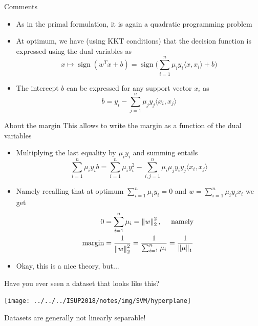 \documentclass[xcolor={usenames,dvipsnames}]{beamer}
\begin{document}
\begin{frame}{Comments}

  \begin{itemize}
    \item As in the primal formulation, it is again a quadratic programming problem
    \item At optimum, we have (using KKT conditions) that the decision function is expressed using the dual variables as
    \begin{equation*}
      x \mapsto \mathop{sign}(w^T x + b) = \mathop{sign}\Big(  \sum_{i=1}^n \mu_i y_i 
      \langle {x, x_i} \rangle  + b \Big)
    \end{equation*}
    \item The intercept $b$ can be expressed for any support vector $x_i$ as
    \begin{equation*}
      b = y_i -  \sum_{j=1}^n \mu_j y_j \langle {x_i, x_j} \rangle 
    \end{equation*}
    
  \end{itemize}
\end{frame}



\begin{frame}{About the margin}
This allows to write the margin as a function of the dual variables
\begin{itemize}
  \item Multiplying the last equality by $\mu_i y_i$ and summing entails
    \begin{equation*}
      \sum_{i=1}^n \mu_i y_i b =  \sum_{i=1}^n \mu_i y_i^2 - \sum_{i, j=1}^n \mu_i \mu_j y_i y_j \langle {x_i, x_j} \rangle 
    \end{equation*}
    \pause
  \item Namely recalling that at optimum $\sum_{i=1}^n \mu_i y_i = 0$ and $w = \sum_{i=1}^n \mu_i y_i x_i$ we get
  \begin{align*}
    0 &= \sum_{i=1}^n \mu_i = \left\| w \right\|_2^2, \quad \text{ namely } \\
      \text{margin} &= \frac{1}{\left\| w \right\|_2^2} = \frac{1}{\sum_{i=1}^n \mu_i} 
    = \frac{1}{\left\| \mu \right\|_1}
  \end{align*}
	\pause 
  \item Okay, this is a nice theory, but...
\end{itemize}
\end{frame}


\begin{frame}
  Have you ever seen a dataset that looks like this?
  
  \begin{center}
    \texttt{[image: ../../../ISUP2018/notes/img/SVM/hyperplane]}
  \end{center}
  
  Datasets are generally \alert{not} linearly separable!

\end{frame}
\end{document}

